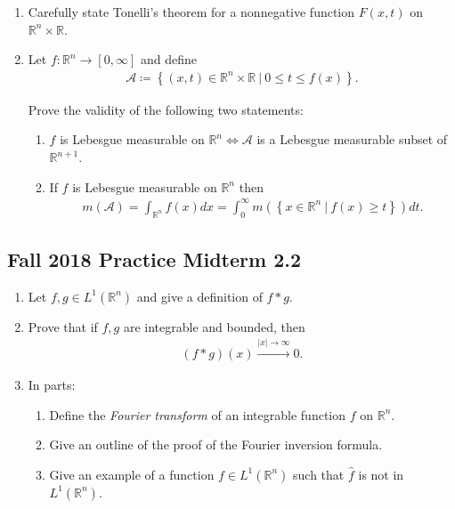 \begin{enumerate}
\def\labelenumi{\alph{enumi}.}
\item
  Carefully state Tonelli's theorem for a nonnegative function
  \(F(x, t)\) on \({\mathbb{R}}^n\times{\mathbb{R}}\).
\item
  Let \(f:{\mathbb{R}}^n\to [0, \infty]\) and define
  \begin{align*}
  {\mathcal{A}}\coloneqq\left\{{(x, t) \in {\mathbb{R}}^n\times{\mathbb{R}}{~\mathrel{\Big\vert}~}0\leq t \leq f(x)}\right\}
  .\end{align*}

  Prove the validity of the following two statements:

  \begin{enumerate}
  \def\labelenumii{\arabic{enumii}.}
  \tightlist
  \item
    \(f\) is Lebesgue measurable on
    \({\mathbb{R}}^{n} \iff {\mathcal{A}}\) is a Lebesgue measurable
    subset of \({\mathbb{R}}^{n+1}\).
  \item
    If \(f\) is Lebesgue measurable on \({\mathbb{R}}^n\) then
    \begin{align*}
    m(\mathcal{A})=\int_{\mathbb{R}^{n}} f(x) d x=\int_{0}^{\infty} m\left(\left\{x \in \mathbb{R}^{n}{~\mathrel{\Big\vert}~}f(x) \geq t\right\}\right) d t
    .\end{align*}
  \end{enumerate}
\end{enumerate}

\hypertarget{fall-2018-practice-midterm-2.2}{%
\subsection{Fall 2018 Practice Midterm
2.2}\label{fall-2018-practice-midterm-2.2}}

\begin{enumerate}
\def\labelenumi{\alph{enumi}.}
\item
  Let \(f, g\in L^1({\mathbb{R}}^n)\) and give a definition of
  \(f\ast g\).
\item
  Prove that if \(f, g\) are integrable and bounded, then
  \begin{align*}
  (f\ast g)(x) \overset{{\left\lvert {x} \right\rvert}\to\infty}\to 0
  .\end{align*}
\item
  In parts:

  \begin{enumerate}
  \def\labelenumii{\arabic{enumii}.}
  \tightlist
  \item
    Define the \emph{Fourier transform} of an integrable function \(f\)
    on \({\mathbb{R}}^n\).
  \item
    Give an outline of the proof of the Fourier inversion formula.
  \item
    Give an example of a function \(f\in L^1({\mathbb{R}}^n)\) such that
    \(\widehat{f}\) is not in \(L^1({\mathbb{R}}^n)\).
  \end{enumerate}
\end{enumerate}


